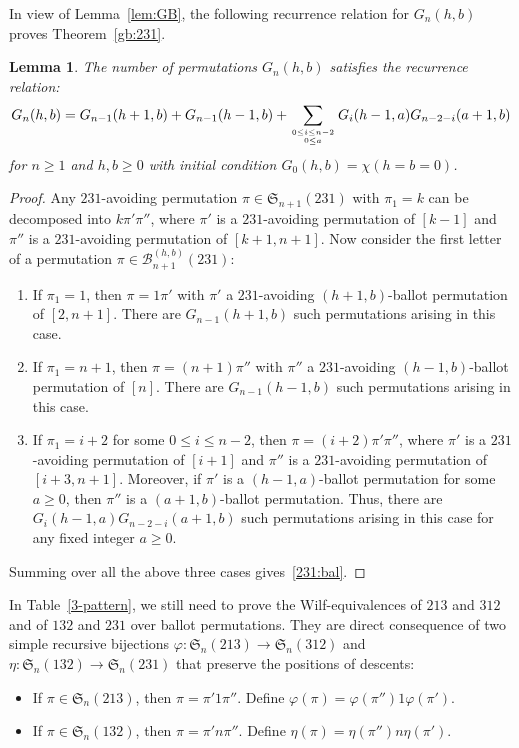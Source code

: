 \documentclass[12pt]{amsart}
\numberwithin{equation}{section}
\theoremstyle{plain}
\newtheorem{lemma}[theorem]{Lemma}
\theoremstyle{definition}
\newcommand{\B}{\mathcal{B}}
\def\S{\mathfrak{S}}
\begin{document}
In view of Lemma~\ref{lem:GB}, the following recurrence relation for $G_n(h,b)$ proves Theorem~\ref{gb:231}. 
\begin{lemma}\label{lema:231}
The number of permutations  $G_n(h,b)$ satisfies the recurrence relation:
\begin{equation}\label{231:bal}
G_n(h,b)=G_{n-1}(h+1,b)+G_{n-1}(h-1,b)+\sum_{0\leq i\leq n-2\atop{0\leq a}}G_i(h-1,a)G_{n-2-i}(a+1,b)
\end{equation}
for $n\geq1$ and $h,b\geq0$ with initial condition $G_0(h,b)=\chi(h=b=0)$.
\end{lemma}
\begin{proof}
Any $231$-avoiding permutation $\pi\in\S_{n+1}(231)$ with $\pi_1=k$ can be decomposed into $k\pi'\pi''$, where $\pi'$ is a $231$-avoiding permutation of $[k-1]$ and $\pi''$ is a $231$-avoiding permutation of $[k+1,n+1]$. Now consider the first letter of a permutation $\pi\in\B_{n+1}^{(h,b)}(231)$:
\begin{enumerate}
\item If $\pi_1=1$, then $\pi=1\pi'$ with $\pi'$ a $231$-avoiding $(h+1,b)$-ballot permutation of  $[2,n+1]$. There are $G_{n-1}(h+1,b)$ such permutations arising in this case. 
\item If $\pi_1=n+1$, then $\pi=(n+1)\pi''$ with $\pi''$ a $231$-avoiding $(h-1,b)$-ballot permutation of  $[n]$. There are $G_{n-1}(h-1,b)$ such permutations arising in this case. 
\item If $\pi_1=i+2$ for some $0\leq i\leq n-2$, then $\pi=(i+2)\pi'\pi''$, where $\pi'$  is a $231$-avoiding permutation of $[i+1]$ and $\pi''$ is a $231$-avoiding permutation of $[i+3,n+1]$. Moreover, if $\pi'$ is a $(h-1,a)$-ballot permutation for some $a\geq0$, then $\pi''$ is a $(a+1,b)$-ballot permutation. Thus, there are $G_{i}(h-1,a)G_{n-2-i}(a+1,b)$ such permutations arising in this case for any fixed integer $a\geq0$. 
\end{enumerate}
Summing over all the above three cases gives~\eqref{231:bal}. 
\end{proof}

In Table~\ref{3-pattern}, we still need to prove the Wilf-equivalences of $213$ and $312$ and of $132$ and $231$ over ballot permutations. They are direct consequence of two simple recursive bijections $\varphi: \S_n(213)\rightarrow\S_n(312)$ and $\eta: \S_n(132)\rightarrow\S_n(231)$ that preserve the positions of descents:
\begin{itemize}
\item If $\pi\in\S_n(213)$, then $\pi=\pi'1\pi''$. Define $\varphi(\pi)=\varphi(\pi'')1\varphi(\pi')$. 
\item If $\pi\in\S_n(132)$, then $\pi=\pi'n\pi''$. Define $\eta(\pi)=\eta(\pi'')n\eta(\pi')$.
\end{itemize}
\end{document}
